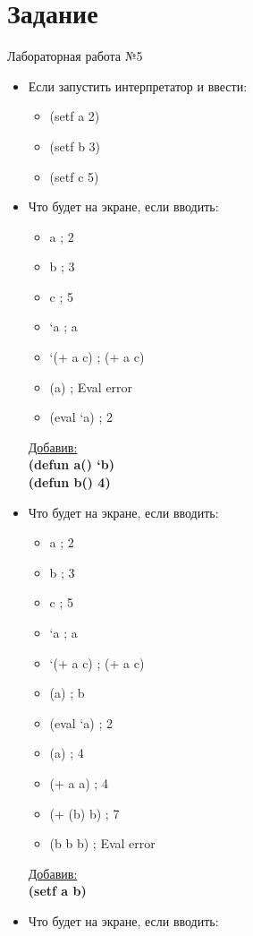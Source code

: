 \newpage
\section*{Задание}
\Large{Лабораторная работа №5}

\begin{itemize}
	\item Если запустить интерпретатор и ввести:
		\begin{itemize}
			\item (setf  a 2)
			\item (setf b 3)
			\item (setf c 5)
		\end{itemize}
	\item Что будет на экране, если вводить:
		\begin{itemize}
			\item a ; 2
			\item b ; 3
			\item c ; 5
			\item ‘a ; a
			\item ‘(+ a c) ; (+ a c)
			\item (a) ; Eval error
			\item (eval ‘a) ; 2
		\end{itemize}
	\underline{Добавив:}\\
	\textbf{(defun a() ‘b) }\\
	\textbf{(defun b() 4)}
	\item Что будет на экране, если вводить:
		\begin{itemize}
			\item a ; 2
			\item b ; 3
			\item c ; 5
			\item ‘a ; a
			\item ‘(+ a c) ; (+ a c)
			\item (a) ; b
			\item (eval ‘a) ; 2
			\item (a) ; 4
			\item (+ a a) ; 4
			\item (+ (b) b) ; 7
			\item (b b b) ; Eval error
		\end{itemize}
	\underline{Добавив:}\\
	\textbf{(setf a b)}
	\item Что будет на экране, если вводить:
		\begin{itemize}

\end{itemize}
\end{itemize}
